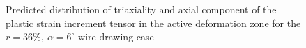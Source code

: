 \documentclass[sn-mathphys,Numbered]{sn-jnl}%
\begin{document}
\begin{figure}[htbp]
	\centering
	\caption{Predicted distribution of triaxiality and axial component of the plastic strain increment tensor in the active deformation zone for the $r=36\%,\ \alpha=6^{\circ}$ wire drawing case}
	\label{fig:wire_draw_other_results}
\end{figure}


\end{document}
